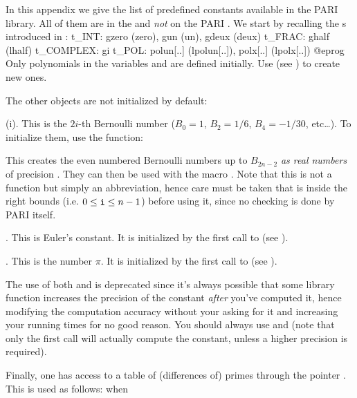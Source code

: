 %
%

In this appendix we give the list of predefined constants available in the
PARI library. All of them are in the  and {\it not\/} on the PARI
. We start by recalling the s introduced in
:
%
\bprog
t_INT: gzero (zero), gun (un), gdeux (deux)
t_FRAC: ghalf (lhalf)
t_COMPLEX: gi
t_POL: polun[..] (lpolun[..]), polx[..] (lpolx[..])
@eprog
\noindent Only polynomials in the variables  and  are
defined initially. Use  (see ) to
create new ones.

\noindent The other objects are not initialized by default:

(i). This is the $2i$-th Bernoulli number ($B_0=1$, $B_2=1/6$,
$B_4=-1/30$, etc\dots). To initialize them, use the function:


This creates the even numbered Bernoulli numbers up to $B_{2n-2}$ {\it as
real numbers\/} of precision . They can then be used with the macro
. Note that this is not a function but simply an abbreviation,
hence care must be taken that  is inside the right bounds (i.e. $0\le
{\tt i}\le n-1$) before using it, since no checking is done by PARI itself.

. This is Euler's constant. It is initialized by the first call
to  (see ).

. This is the number $\pi$.  It is initialized by the first call to
 (see ).

The use of both  and  is deprecated since it's always
possible that some library function increases the precision of the constant
{\it after} you've computed it, hence modifying the computation accuracy
without your asking for it and increasing your running times for no good
reason. You should always use  and  (note that only
the first call will actually compute the constant, unless a higher precision
is required).

Finally, one has access to a table of (differences of) primes through the
pointer . This is used as follows: when

